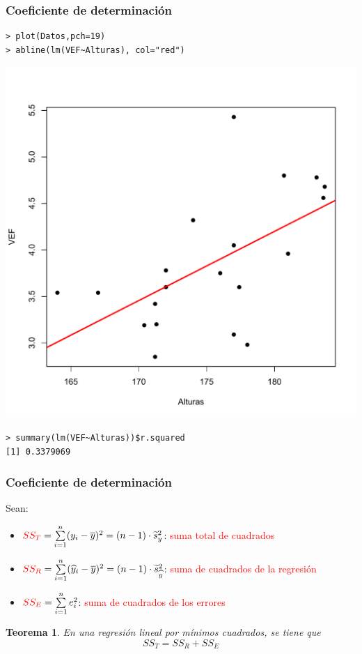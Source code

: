 \documentclass[12pt,t]{beamer}
\newcommand{\red}[1]{\textcolor{red}{#1}}
\theoremstyle{plain}
\newtheorem{teorema}{Teorema}
\theoremstyle{definition}
\begin{document}
\begin{frame}[fragile]
\frametitle{Coeficiente de determinación}

\begin{lstlisting}
> plot(Datos,pch=19)
> abline(lm(VEF~Alturas), col="red")
\end{lstlisting}\vspace*{-3ex}

\begin{center}
\includegraphics[width=0.6\linewidth]{plotVEF2.pdf}
\end{center}\vspace*{-3ex}


\begin{lstlisting}
> summary(lm(VEF~Alturas))$r.squared
[1] 0.3379069
\end{lstlisting}

\end{frame}

\begin{frame}
\frametitle{Coeficiente de determinación}
Sean:
\begin{itemize}
\item $\red{SS_T} =\sum\limits_{i=1}^n(y_i-\overline{y})^2=(n-1)\cdot \widetilde{s}_y^2$: \red{suma total de cuadrados}

\item $\red{SS_R}=\sum\limits_{i=1}^n(\widehat{y}_i-\overline{y})^2=(n-1)\cdot \widetilde{s}_{\widehat{y}}^2$: \red{suma de cuadrados de la regresión} 

\item $\red{SS_E}=\sum\limits_{i=1}^n e_i^2$: \red{suma de cuadrados de los errores}
\end{itemize}

\begin{teorema}
En una regresión lineal por mínimos cuadrados, se tiene que
$$
SS_T=SS_R+SS_E
$$
\end{teorema}

\end{frame}
\end{document}
